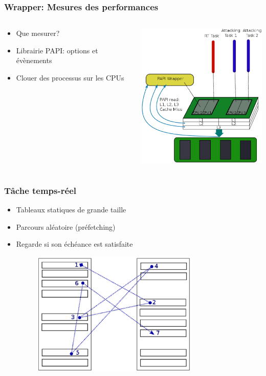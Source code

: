 \documentclass{beamer}
\begin{document}
    \begin{frame}[label=wrapper]
    \frametitle{Wrapper: Mesures des performances}
    \begin{columns}
        \begin{column}{0.6\textwidth}
            \begin{itemize}
                \item Que mesurer?
                \item Librairie PAPI: options et évènements
                \item Clouer des processus sur les CPUs
            \end{itemize}
        \end{column}
        \begin{column}{0.6\textwidth}
            \includegraphics[width=6.5cm]{doc/psar_wrapper.eps}
        \end{column}
    \end{columns}
    \end{frame}

    \begin{frame}[label=temps-reel]
    \frametitle{Tâche temps-réel}
    \begin{itemize}
        \item Tableaux statiques de grande taille
        \item Parcours aléatoire (préfetching)
        \item Regarde si son échéance est satisfaite
            \begin{figure}
                \includegraphics[width=8cm]{doc/psar_rt.eps}
            \end{figure}
    \end{itemize}
    \end{frame}
    
\end{document}
